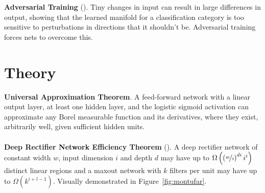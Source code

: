 \documentclass{article}
\begin{document}
\\\\
\noindent
\textbf{Adversarial Training} (). Tiny changes in input can result in large differences in output, showing that the learned manifold for a classification category is too sensitive to perturbations in directions that it shouldn't be. Adversarial training forces nets to overcome this.

\section{Theory}

\noindent
\textbf{Universal Approximation Theorem}. A feed-forward network with a linear output layer, at least one hidden layer, and the logistic sigmoid activation can approximate any Borel measurable function and its derivatives, where they exist, arbitrarily well, given sufficient hidden units.
\\\\
\noindent
\textbf{Deep Rectifier Network Efficiency Theorem} (). A deep rectifier network of constant width $w$, input dimension $i$ and depth $d$ may have up to $\Omega\left({\left({\nicefrac{w}{i}}\right)^{di}i^i}\right)$ distinct linear regions and a maxout network with $k$ filters per unit may have up to $\Omega(k^{i+l-1})$. Visually demonstrated in Figure~\ref{fig:montufar}.
\end{document}
